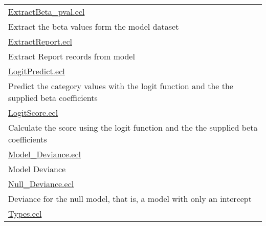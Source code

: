 {\begin{longtable}{|p{\textwidth}|}
\hline
\hyperlink{ecldoc:toc:ExtractBeta_pval}{ExtractBeta\_pval.ecl} \\
Extract the beta values form the model dataset \\
\hline
\hyperlink{ecldoc:toc:ExtractReport}{ExtractReport.ecl} \\
Extract Report records from model \\
\hline
\hyperlink{ecldoc:toc:LogitPredict}{LogitPredict.ecl} \\
Predict the category values with the logit function and the the supplied beta coefficients \\
\hline
\hyperlink{ecldoc:toc:LogitScore}{LogitScore.ecl} \\
Calculate the score using the logit function and the the supplied beta coefficients \\
\hline
\hyperlink{ecldoc:toc:Model_Deviance}{Model\_Deviance.ecl} \\
Model Deviance \\
\hline
\hyperlink{ecldoc:toc:Null_Deviance}{Null\_Deviance.ecl} \\
Deviance for the null model, that is, a model with only an intercept \\
\hline
\hyperlink{ecldoc:toc:Types}{Types.ecl} \\
\hline
\end{longtable}
}



















